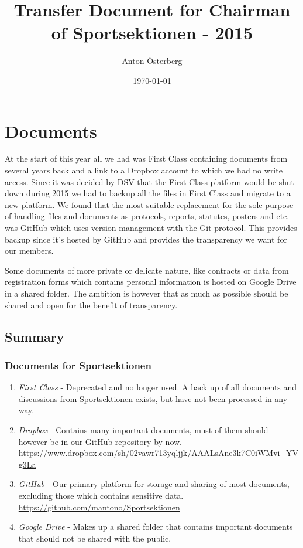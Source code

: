 \documentclass[12pt,a4paper]{article}
\begin{document}
	\title{\Huge Transfer Document for Chairman of Sportsektionen - 2015}
	\author{Anton Österberg}
	\date{\today}

	\maketitle

	\null
	\vfill

	\clearpage

	\section{Documents}
	At the start of this year all we had was First Class containing documents from several years back and a link to a Dropbox account to which we had no write access. Since it was decided by DSV that the First Class platform would be shut down during 2015 we had to backup all the files in First Class and migrate to a new platform. We found that the most suitable replacement for the sole purpose of handling files and documents as protocols, reports, statutes, posters and etc. was GitHub which uses version management with the Git protocol. This provides backup since it's hosted by GitHub and provides the transparency we want for our members.

	Some documents of more private or delicate nature, like contracts or data from registration forms which contains personal information is hosted on Google Drive in a shared folder. The ambition is however that as much as possible should be shared and open for the benefit of transparency.

		\subsection{Summary}
		\subsubsection{Documents for Sportsektionen}

		\begin{enumerate}
			\item \emph{First Class} - Deprecated and no longer used. A back up of all documents and discussions from Sportsektionen exists, but have not been processed in any way.
			\item \emph{Dropbox} - Contains many important documents, must of them should however be in our GitHub repository by now.\\
			\url{https://www.dropbox.com/sh/02vawr713yqljjk/AAALsAne3k7C0iWMvi_YVg3La}
			\item \emph{GitHub} - Our primary platform for storage and sharing of most documents, excluding those which contains sensitive data.\\
			\url{https://github.com/mantono/Sportsektionen}
			\item \emph{Google Drive} - Makes up a shared folder that contains important documents that should not be shared with the public.
		\end{enumerate}
\end{document}
